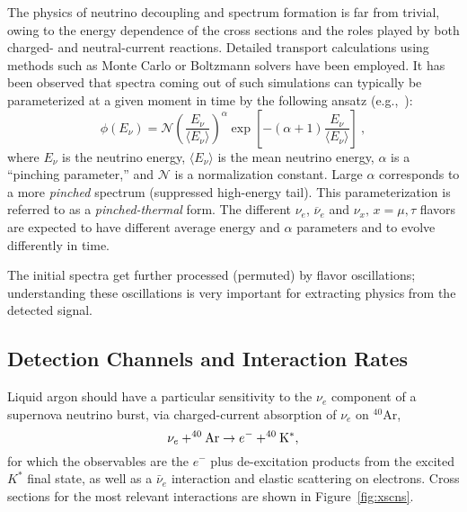 The physics of neutrino decoupling and spectrum formation is far from trivial, owing to the energy dependence of the cross sections and the roles played by both charged- and neutral-current reactions.
Detailed transport calculations using methods such as Monte Carlo or Boltzmann solvers have been employed. It has been observed that spectra coming out of such simulations can typically be parameterized at a given moment in time by the following ansatz (e.g.,~\cite{Minakata:2008nc,Tamborra:2012ac}):
\begin{equation}
        \label{eq:pinched}
        \phi(E_{\nu}) = \mathcal{N} 
        \left(\frac{E_{\nu}}{\langle E_{\nu} \rangle}\right)^{\alpha} \exp\left[-\left(\alpha + 1\right)\frac{E_{\nu}}{\langle E_{\nu} \rangle}\right] \ ,
\end{equation}
where $E_{\nu}$ is the neutrino energy, $\langle E_\nu \rangle$ is the
mean neutrino energy, $\alpha$ is a ``pinching parameter,'' and
$\mathcal{N}$ is a normalization constant.
%
Large $\alpha$ corresponds to a more \emph{pinched} spectrum (suppressed
high-energy tail). This parameterization is referred to as a
\emph{pinched-thermal} form. The different $\nu_e$, $\overline{\nu}_e$ and
$\nu_x, \, x = \mu, \tau$ flavors are expected to have different
average energy and $\alpha$ parameters and to evolve differently in
time. 

The initial spectra get further processed (permuted) by flavor oscillations; understanding these oscillations is very important for extracting physics from the detected signal.


\subsection{Detection Channels and Interaction Rates}

Liquid argon should have  a particular sensitivity to the $\nu_e$
component of a supernova neutrino burst, via charged-current
absorption of $\nu_e$ on $^{40}$Ar,
\begin{equation}
\nu_e + ^{40}{\rm Ar} \rightarrow e^- + ^{40}{\rm K^*},
\label{eq:nueabs}
\end{equation}
for which the observables are the $e^-$ plus de-excitation products from the excited $K^*$ final state, as well as a $\bar{\nu}_e$ interaction and elastic scattering on electrons.
Cross sections for the most
relevant interactions are shown in Figure~\ref{fig:xscns}.

